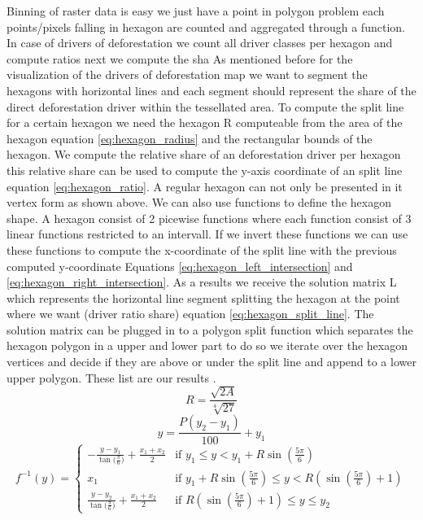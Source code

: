		Binning of raster data is easy we just have a point in polygon problem each points/pixels falling in hexagon are counted and aggregated through a function. In case of drivers of deforestation we count all driver classes per hexagon and compute ratios next we compute the sha 
		As mentioned before for the visualization of the drivers of deforestation map we want to segment the hexagons with horizontal lines and each segment should represent the share of the direct deforestation driver within the tessellated area. To compute the split line for a certain hexagon we need the hexagon R computeable from the area of the hexagon equation \ref{eq:hexagon_radius} and the rectangular bounds of the hexagon. We compute the relative share of an deforestation driver per hexagon this relative share can be used to compute the y-axis coordinate of an split line equation \ref{eq:hexagon_ratio}. A regular hexagon can not only be presented in it vertex form as shown above. We can also use functions to define the hexagon shape. A hexagon consist of 2 picewise functions where each function consist of 3 linear functions restricted to an intervall. If we invert these functions we can use these functions to compute the x-coordinate of the split line with the previous computed y-coordinate Equations \ref{eq:hexagon_left_intersection} and \ref{eq:hexagon_right_intersection}. As a results we receive the solution matrix L which represents the horizontal line segment splitting the hexagon at the point where we want (driver ratio share) equation \ref{eq:hexagon_split_line}. The solution matrix can be plugged in to a polygon split function which separates the hexagon polygon in a upper and lower part to do so we iterate over the hexagon vertices and decide if they are above or under the split line and append to a lower upper polygon. These list are our results .
		\begin{equation}
		\label{eq:hexagon_radius}
			R = \frac{\sqrt{2A}}{\sqrt[4]{27}}
		\end{equation}
		\begin{equation}
		\label{eq:hexagon_ratio}
			y = \frac{P(y_2-y_1)}{100} + y_1
		\end{equation}
		\begin{equation}
		\label{eq:hexagon_left_intersection}
			f^{-1}(y) =
			\begin{cases} 
				-\frac{y - y_1}{\tan{(\frac{\pi}{6}})} + \frac{x_1 + x_2}{2} & \text{if } y_1 \le y < y_1 + R\sin{(\frac{5\pi}{6})} \\
				x_1 & \text{if } y_1 + R\sin{(\frac{5\pi}{6})} \le y < R(\sin{(\frac{5\pi}{6})} + 1) \\
				\frac{y - y_2}{\tan{(\frac{\pi}{6}})} + \frac{x_1 + x_2}{2} & \text{if } R(\sin{(\frac{5\pi}{6})} + 1) \le y \le y_2
			\end{cases}
		\end{equation}
